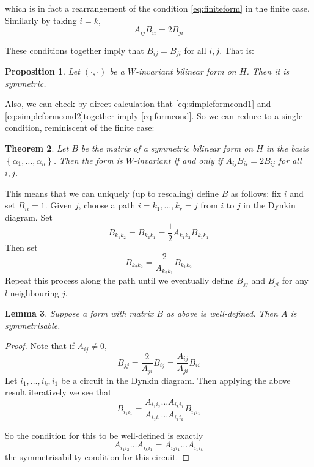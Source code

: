\documentclass[11pt,a4paper]{report}
\newtheorem{theorem}{Theorem}[chapter]
\newtheorem{lemma}[theorem]{Lemma}
\newtheorem{proposition}[theorem]{Proposition}
\theoremstyle{definition}
\begin{document}
which is in fact a rearrangement of the condition \eqref{eq:finiteform} in the finite case. Similarly by taking $i = k$, \begin{equation} \label{eq:simpleformcond2} A_{ij} B_{ii} = 2 B_{ji}\end{equation}

These conditions together imply that $B_{ij} = B_{ji}$ for all $i, j$. That is: 


\begin{proposition}\label{prop:symmform} Let $(\cdot, \cdot)$ be a $W$-invariant bilinear form on $H$. Then it is symmetric.\end{proposition}

Also, we can check by direct calculation that \eqref{eq:simpleformcond1} and \eqref{eq:simpleformcond2}together imply \eqref{eq:formcond}. So we can reduce to a single condition, reminiscent of the finite case:

\begin{theorem} \label{thm:invariantformcond} Let $B$ be the matrix of a symmetric bilinear form on $H$ in the basis $\left\{\alpha_1, \ldots, \alpha_n\right\}$. Then the form is $W$-invariant if and only if $A_{ij} B_{ii} = 2 B_{ij}$ for all $i, j$.\end{theorem}

This means that we can uniquely (up to rescaling) define $B$ as follows: fix $i$ and set $B_{ii} = 1$. Given $j$, choose a path $i = k_1, \ldots, k_r = j$ from $i$ to $j$ in the Dynkin diagram. Set \begin{equation*}B_{k_1k_2} = B_{k_2k_1} = \dfrac{1}{2} A_{k_1k_2} B_{k_1k_1}\end{equation*} Then set \begin{equation*}B_{k_2k_2} = \dfrac{2}{A_{k_2k_1}} B_{k_1k_2}\end{equation*} Repeat this process along the path until we eventually define $B_{jj}$ and $B_{jl}$ for any $l$ neighbouring $j$. 

\begin{lemma} Suppose a form with matrix $B$ as above is well-defined. Then $A$ is symmetrisable. \end{lemma} 
\begin{proof} Note that if $A_{ij} \neq 0$, \begin{equation*}B_{jj} = \dfrac{2}{A_{ji}} B_{ij} = \dfrac{A_{ij}}{A_{ji}} B_{ii}\end{equation*} Let $i_1, \ldots, i_k, i_1$ be a circuit in the Dynkin diagram. Then applying the above result iteratively we see that \begin{equation*}B_{i_1 i_1} = \frac{A_{i_1i_2} \ldots A_{i_ki_1}}{A_{i_2i_1} \ldots A_{i_1i_k}} B_{i_1 i_1}\end{equation*} 

 So the condition for this to be well-defined is exactly \begin{equation*}A_{i_1i_2} \ldots A_{i_ki_1} = A_{i_2i_1} \ldots A_{i_1i_k}\end{equation*} the symmetrisability condition for this circuit. \end{proof}
\end{document}
